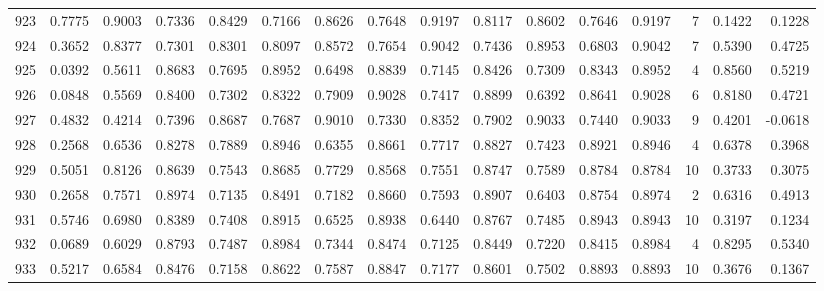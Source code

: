 \begin{tabular}{lrrrrrrrrrrrrrrr}
923 &      0.7775 &  0.9003 &  0.7336 &  0.8429 &  0.7166 &  0.8626 &  0.7648 &  0.9197 &  0.8117 &  0.8602 &   0.7646 &     0.9197 &      7 &                    0.1422 &                     0.1228 \\
924 &      0.3652 &  0.8377 &  0.7301 &  0.8301 &  0.8097 &  0.8572 &  0.7654 &  0.9042 &  0.7436 &  0.8953 &   0.6803 &     0.9042 &      7 &                    0.5390 &                     0.4725 \\
925 &      0.0392 &  0.5611 &  0.8683 &  0.7695 &  0.8952 &  0.6498 &  0.8839 &  0.7145 &  0.8426 &  0.7309 &   0.8343 &     0.8952 &      4 &                    0.8560 &                     0.5219 \\
926 &      0.0848 &  0.5569 &  0.8400 &  0.7302 &  0.8322 &  0.7909 &  0.9028 &  0.7417 &  0.8899 &  0.6392 &   0.8641 &     0.9028 &      6 &                    0.8180 &                     0.4721 \\
927 &      0.4832 &  0.4214 &  0.7396 &  0.8687 &  0.7687 &  0.9010 &  0.7330 &  0.8352 &  0.7902 &  0.9033 &   0.7440 &     0.9033 &      9 &                    0.4201 &                    -0.0618 \\
928 &      0.2568 &  0.6536 &  0.8278 &  0.7889 &  0.8946 &  0.6355 &  0.8661 &  0.7717 &  0.8827 &  0.7423 &   0.8921 &     0.8946 &      4 &                    0.6378 &                     0.3968 \\
929 &      0.5051 &  0.8126 &  0.8639 &  0.7543 &  0.8685 &  0.7729 &  0.8568 &  0.7551 &  0.8747 &  0.7589 &   0.8784 &     0.8784 &     10 &                    0.3733 &                     0.3075 \\
930 &      0.2658 &  0.7571 &  0.8974 &  0.7135 &  0.8491 &  0.7182 &  0.8660 &  0.7593 &  0.8907 &  0.6403 &   0.8754 &     0.8974 &      2 &                    0.6316 &                     0.4913 \\
931 &      0.5746 &  0.6980 &  0.8389 &  0.7408 &  0.8915 &  0.6525 &  0.8938 &  0.6440 &  0.8767 &  0.7485 &   0.8943 &     0.8943 &     10 &                    0.3197 &                     0.1234 \\
932 &      0.0689 &  0.6029 &  0.8793 &  0.7487 &  0.8984 &  0.7344 &  0.8474 &  0.7125 &  0.8449 &  0.7220 &   0.8415 &     0.8984 &      4 &                    0.8295 &                     0.5340 \\
933 &      0.5217 &  0.6584 &  0.8476 &  0.7158 &  0.8622 &  0.7587 &  0.8847 &  0.7177 &  0.8601 &  0.7502 &   0.8893 &     0.8893 &     10 &                    0.3676 &                     0.1367 \\

\end{tabular}
